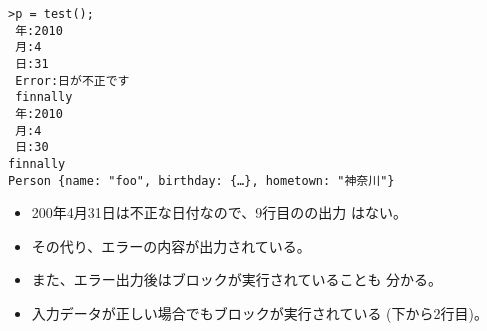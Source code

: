 \begin{Verbatim}
>p = test();
 年:2010
 月:4
 日:31
 Error:日が不正です
 finnally
 年:2010
 月:4
 日:30
finnally
Person {name: "foo", birthday: {…}, hometown: "神奈川"}
\end{Verbatim}
\begin{itemize}
 \item 200年4月31日は不正な日付なので、9行目のの出力
       はない。
 \item その代り、エラーの内容が出力されている。
 \item また、エラー出力後はブロックが実行されていることも
       分かる。
 \item 入力データが正しい場合でもブロックが実行されている
       (下から2行目)。
\end{itemize}